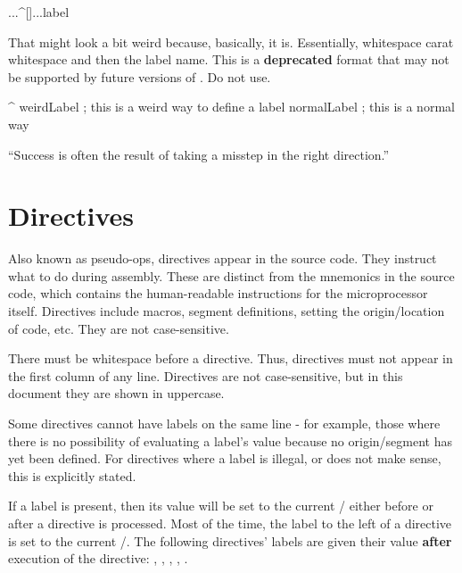 \begin{usage}
[]...^[]...label
\end{usage}

That might look a bit weird because, basically, it is. Essentially, whitespace carat whitespace and then the label name. This is a \textbf{deprecated} format that may not be supported by future versions of \dasm. Do not use.

\begin{code}
   ^ weirdLabel  ; this is a weird way to define a label
 normalLabel     ; this is a normal way
\end{code}



\begin{savequote}
\sffamily
``Success is often the result of taking a misstep in the right direction.''
\end{savequote}

\chapter{Directives}



\label{chapter:pseudoops}

Also known as pseudo-ops, directives appear in the source code. They instruct \dasm what to do during assembly. These are distinct from the mnemonics in the source code, which contains the human-readable instructions for the microprocessor itself. Directives include macros, segment definitions, setting the origin/location of code, etc. They are not case-sensitive.

There must be whitespace before a directive. Thus, directives must not appear in the first column of any line. Directives are not case-sensitive, but in this document they are shown in uppercase.

Some directives cannot have labels on the same line - for example, those where there is no possibility of evaluating a label's value because no origin/segment has yet been defined. For directives where a label is illegal, or does not make sense, this is explicitly stated.

If a label is present, then its value will be set to the current / either before or after
a directive is processed.  Most of the time, the label to the left of a
directive is set to the current /. The following directives' labels are given their value {\bf after} execution of the directive: , , , , .

